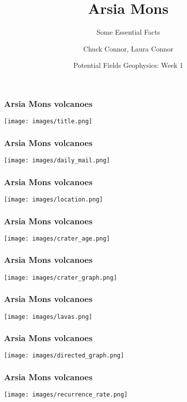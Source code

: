 \documentclass{beamer}
\title{Arsia Mons}
\subtitle{Some Essential Facts}
\author[]{Chuck Connor, Laura Connor}
\date{Potential Fields Geophysics: Week 1}
\begin{document}
\begin{frame}
\frametitle{Arsia Mons volcanoes}
\begin{center}
\texttt{[image: images/title.png]}
\end{center}
\end{frame}

\begin{frame}
\frametitle{Arsia Mons volcanoes}
\begin{center}
\texttt{[image: images/daily\_mail.png]}
\end{center}
\end{frame}

\begin{frame}
\frametitle{Arsia Mons volcanoes}
\begin{center}
\texttt{[image: images/location.png]}
\end{center}
\end{frame}

\begin{frame}
\frametitle{Arsia Mons volcanoes}
\begin{center}
\texttt{[image: images/crater\_age.png]}
\end{center}
\end{frame}

\begin{frame}
\frametitle{Arsia Mons volcanoes}
\begin{center}
\texttt{[image: images/crater\_graph.png]}
\end{center}
\end{frame}

\begin{frame}
\frametitle{Arsia Mons volcanoes}
\begin{center}
\texttt{[image: images/lavas.png]}
\end{center}
\end{frame}


\begin{frame}
\frametitle{Arsia Mons volcanoes}
\begin{center}
\texttt{[image: images/directed\_graph.png]}
\end{center}
\end{frame}


\begin{frame}
\frametitle{Arsia Mons volcanoes}
\begin{center}
\texttt{[image: images/recurrence\_rate.png]}
\end{center}
\end{frame}
\end{document}
